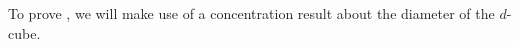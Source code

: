\documentclass{patmorin}
\newcommand{\abas}[1]{\textcolor{orange}{\big[Abbas: #1\big]}}
\begin{document}
%
%
%
%
To prove , we will make use of a concentration
result about the diameter of the $d$-cube.
\end{document}
